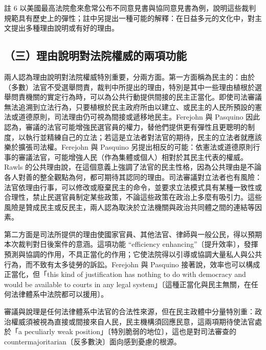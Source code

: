 註 6 以美國最高法院愈來愈常公布不同意見書與協同意見書為例，說明這些裁判規範具有歷史上的彈性；註中另提出一種可能的解釋：在日益多元的文化中，對主文提出多種理由說明或有好的理由。

\subsection{（三）理由說明對法院權威的兩項功能}

兩人認為理由說明對法院權威特別重要，分兩方面。第一方面稱為民主的：由於（多數）法官不受選舉問責，裁判中所提出的理由，特別是其中一些理由植根於選舉問責機關的實定行為時，可以為公共行動提供間接的民主正當化。即使司法審議無法追溯到立法行為，只要植根於民主政府所由以建立、或民主的人民所預設的憲法或道德原則，司法理由仍可視為間接或遞移地民主。Ferejohn 與 Pasquino 因此認為，審議的法官可能增強民選官員的權力，替他們提供更有彈性且更聰明的制度，以執行並精練自己的立法；若這是立法者對法官的期待，民主的立法者就應該樂於擴張司法權。Ferejohn 與 Pasquino 另提出相反的可能：依憲法或道德原則行事的審議法官，可能增強人民（作為集體或個人）相對於其民主代表的權威。Rawls 的公共理由說，在這個意義上強調了法官的民主性格，因為公共理由是不論各人對善的整全觀點為何，都可期待其認同的理由。司法審議對立法者也有風險：法官依理由行事，可以修改或廢棄民主的命令，並要求立法模式具有某種一致性或合理性，禁止民選官員制定某些政策，不論這些政策在政治上多麼有吸引力。這些風險是贊成民主或反民主，兩人認為取決於立法機關與政治共同體之間的連結等因素。

第二方面是司法所提供的理由使國家官員、其他法官、律師與一般公民，得以預期本次裁判對日後案件的意涵。這項功能 ``efficiency enhancing''〔提升效率〕，發揮預測與協調的作用，不具正當化的作用；它使法院得以引導或協調大量私人與公共行為，而不致有太多徒勞的訴訟。Ferejohn 與 Pasquino 接著說，效率也可以構成正當化，但「this kind of justification has nothing to do with democracy and would be available to courts in any legal system」〔這種正當化與民主無關，在任何法律體系中法院都可以援用〕。

審議與說理是任何法律體系中法官的合法性來源，但在民主政體中分量特別重：政治權威須被視為直接或間接來自人民，民主機構須回應民意，這兩項期待使法官處於「a peculiarly weak position」〔特別脆弱的地位〕，這也是對司法審查的 countermajoritarian〔反多數決〕面向感到憂慮的根源。

